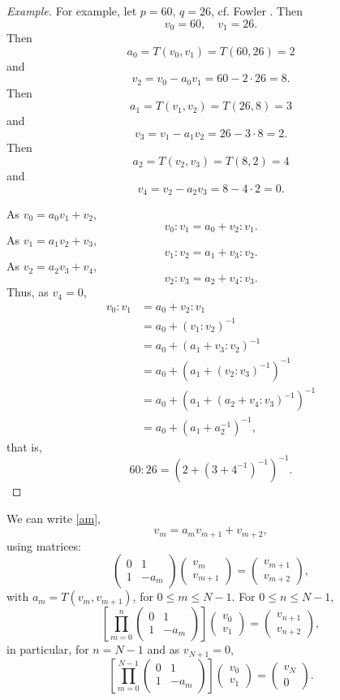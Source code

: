 \documentclass{article}
\begin{document}
\begin{proof}[Example]
For example,
let $p=60$, $q=26$, cf. Fowler \cite[pp.~25--28]{fowler}. Then
\[
v_0=60,\quad v_1=26.
\]
Then
\[
a_0 = T(v_0,v_1) = T(60,26) = 2
\]
and
\[
v_2 = v_0 - a_0v_1 = 60-2 \cdot 26 = 8.
\]
Then 
\[
a_1 = T(v_1,v_2) = T(26,8)=3
\]
and
\[
v_3 = v_1 - a_1v_2 = 26 - 3 \cdot 8 = 2.
\]
Then
\[
a_2 = T(v_2,v_3) = T(8,2) =4
\]
and
\[
v_4 = v_2 - a_2v_3 = 8 - 4\cdot 2 = 0.
\]

As $v_0 = a_0v_1 + v_2$, 
\[
v_0:v_1 = a_0 + v_2 : v_1.
\]
As $v_1 = a_1v_2 + v_3$,
\[
v_1:v_2 = a_1 + v_3:v_2.
\]
As $v_2 = a_2v_3 + v_4$,
\[
v_2:v_3 = a_2 + v_4:v_3.
\]
Thus, as $v_4=0$,
\begin{align*}
v_0:v_1 &=a_0+v_2:v_1\\
&=a_0+(v_1:v_2)^{-1}\\
&=a_0+(a_1+v_3:v_2)^{-1}\\
&=a_0+(a_1+(v_2:v_3)^{-1})^{-1}\\
&=a_0+(a_1+(a_2+v_4:v_3)^{-1})^{-1}\\
&=a_0+(a_1+a_2^{-1})^{-1},
\end{align*}
that is,
\[
60:26 = (2+(3+4^{-1})^{-1})^{-1}.
\]
\end{proof}


We can write \eqref{am}, 
\[
v_m = a_m v_{m+1} + v_{m+2},
\]
using matrices:
\begin{equation}
\begin{pmatrix} 0&1\\1&-a_m\end{pmatrix} \begin{pmatrix} v_m\\v_{m+1} \end{pmatrix}
=\begin{pmatrix} v_{m+1}\\v_{m+2}\end{pmatrix},
\label{amvm}
\end{equation}
with $a_m=T(v_m,v_{m+1})$, for $0 \leq m \leq N-1$. 
For $0 \leq n \leq N-1$,
\[
\left[ \prod_{m=0}^n\begin{pmatrix} 0&1\\1&-a_m\end{pmatrix}\right]  \begin{pmatrix} v_0\\v_1\end{pmatrix} 
=\begin{pmatrix}v_{n+1}\\v_{n+2}\end{pmatrix},
\]
in particular, for $n=N-1$ and as $v_{N+1}=0$,
\[
\left[ \prod_{m=0}^{N-1} \begin{pmatrix} 0&1\\1&-a_m\end{pmatrix}\right]  \begin{pmatrix} v_0\\v_1\end{pmatrix} 
=\begin{pmatrix}v_N\\0\end{pmatrix}.
\]
\end{document}
